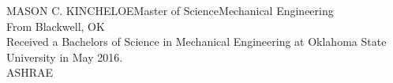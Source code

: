 \newpage
\begin{vita}{MASON C. KINCHELOE}{Master of Science}{Mechanical Engineering} %
     \\ From Blackwell, OK
     \\ Received a Bachelors of Science in Mechanical Engineering at Oklahoma State University in May 2016.
     \\ ASHRAE
\end{vita}
